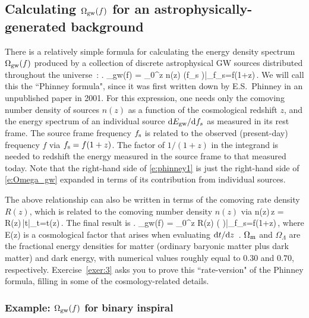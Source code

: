 \subsection{Calculating $\Omega_{\rm gw}(f)$ for an
astrophysically-generated background}
\label{s:Phinney_formula}

There is a relatively simple formula for calculating
the energy density spectrum $\Omega_{\rm gw}(f)$ 
produced by a collection of discrete astrophysical GW 
sources distributed throughout the universe~\cite{Phinney:2001}:
%
\be
\left.
\Omega_{\rm gw}(f) = \int_0^\infty \D z\>
n(z) \left(f_{\rm s}
\right)\right|_{f_{\rm s}=f(1+z)}\,.
\label{e:phinney1}
\ee
%
We will call this the ``Phinney formula", since it was 
first written down by E.S.~Phinney in an unpublished
paper in 2001.
For this expression,
one needs only the comoving number density of
sources $n(z)$ as a function of the cosmological redshift $z$, 
and the energy spectrum of an individual source
${\rm d} E_{\rm gw}/{\rm d} f_s$ as measured in its rest frame.
The source frame frequency $f_{\rm s}$ is related to the 
observed (present-day) frequency $f$ via $f_{\rm s}=f(1+z)$.
The factor of $1/(1+z)$ in the integrand is needed to 
redshift the energy measured in the source frame to that
measured today.
Note that the right-hand side of \eqref{e:phinney1} is
just the right-hand side of \eqref{e:Omega_gw} expanded in 
terms of its contribution from individual sources.

The above relationship can also be written in terms of 
the comoving rate density $R(z)$, which is related to the
comoving number density $n(z)$ via
%
\be
n(z)\,\D z = R(z)\,|\D t|_{t=t(z)}\,.
\ee
%
The final result is
%
\be
\left.
\Omega_{\rm gw}(f) = \int_0^\infty \D z\>
R(z) \left(
\right)\right|_{f_{\rm s}=f(1+z)}\,,
\label{e:phinney2}
\ee
%
where 
%
\be
E(z)\equiv {}
\ee
%
is a cosmological factor that arises when evaluating 
${\rm d} t/{\rm d} z$~\cite{Ryden:2003}.
$\Omega_{\rm m}$ and $\Omega_\Lambda$ are the 
fractional energy densities for matter
(ordinary baryonic matter plus dark matter) 
and dark energy, with numerical values roughly
equal to $0.30$ and $0.70$, respectively.
Exercise~\ref{exer:3} asks you to prove this 
``rate-version" of the Phinney formula, filling in some 
of the cosmology-related details.

\subsubsection{Example: $\Omega_{\rm gw}(f)$ for binary inspiral}
\label{s:binary_inspiral}

